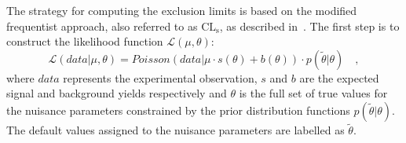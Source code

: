 The strategy for computing the exclusion limits is based on the modified frequentist approach, also referred to as $\mathrm{CL_s}$, as described in~\cite{CMS-NOTE-2011-005}. The first step is to construct the likelihood function $\mathcal{L}(\mu,\theta)$:
\begin{equation}
\mathcal{L}(data|\mu,\theta) = Poisson(data|\mu\cdot s(\theta) + b(\theta))\cdot p(\tilde{\theta}|\theta) \quad,
\end{equation}
where $data$ represents the experimental observation, $s$ and $b$ are the expected signal and background yields respectively and $\theta$ is the full set of true values for the nuisance parameters constrained by the prior distribution functions $p(\tilde{\theta}|\theta)$. The default values assigned to the nuisance parameters are labelled as $\tilde{\theta}$.

